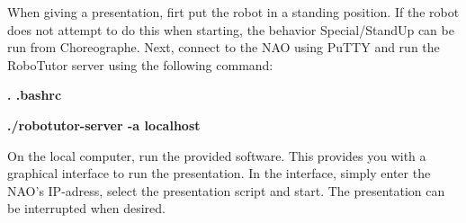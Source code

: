 When giving a presentation, firt put the robot in a standing position. If the robot does not attempt to do this when starting, the behavior Special/StandUp can be run from Choreographe.
Next, connect to the NAO using PuTTY and run the RoboTutor server using the following command:

\textbf{. .bashrc}

\textbf{./robotutor-server -a localhost}



On the local computer, run the provided software. This provides you with a graphical interface to run the presentation. In the interface, simply enter the NAO's IP-adress, select the presentation script and start. The presentation can be interrupted when desired.
